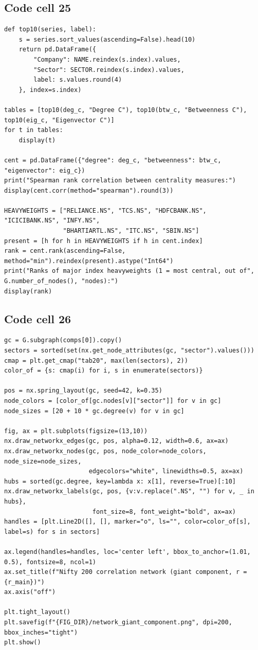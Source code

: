 \documentclass[12pt,a4paper]{report}
\begin{document}
\subsection*{Code cell 25}
\begin{lstlisting}[style=fancy]
def top10(series, label):
    s = series.sort_values(ascending=False).head(10)
    return pd.DataFrame({
        "Company": NAME.reindex(s.index).values,
        "Sector": SECTOR.reindex(s.index).values,
        label: s.values.round(4)
    }, index=s.index)

tables = [top10(deg_c, "Degree C"), top10(btw_c, "Betweenness C"), top10(eig_c, "Eigenvector C")]
for t in tables:
    display(t)

cent = pd.DataFrame({"degree": deg_c, "betweenness": btw_c, "eigenvector": eig_c})
print("Spearman rank correlation between centrality measures:")
display(cent.corr(method="spearman").round(3))

HEAVYWEIGHTS = ["RELIANCE.NS", "TCS.NS", "HDFCBANK.NS", "ICICIBANK.NS", "INFY.NS",
                "BHARTIARTL.NS", "ITC.NS", "SBIN.NS"]
present = [h for h in HEAVYWEIGHTS if h in cent.index]
rank = cent.rank(ascending=False, method="min").reindex(present).astype("Int64")
print("Ranks of major index heavyweights (1 = most central, out of", G.number_of_nodes(), "nodes):")
display(rank)
\end{lstlisting}

\subsection*{Code cell 26}
\begin{lstlisting}[style=fancy]
gc = G.subgraph(comps[0]).copy()
sectors = sorted(set(nx.get_node_attributes(gc, "sector").values()))
cmap = plt.get_cmap("tab20", max(len(sectors), 2))
color_of = {s: cmap(i) for i, s in enumerate(sectors)}

pos = nx.spring_layout(gc, seed=42, k=0.35)
node_colors = [color_of[gc.nodes[v]["sector"]] for v in gc]
node_sizes = [20 + 10 * gc.degree(v) for v in gc]

fig, ax = plt.subplots(figsize=(13,10))
nx.draw_networkx_edges(gc, pos, alpha=0.12, width=0.6, ax=ax)
nx.draw_networkx_nodes(gc, pos, node_color=node_colors, node_size=node_sizes,
                       edgecolors="white", linewidths=0.5, ax=ax)
hubs = sorted(gc.degree, key=lambda x: x[1], reverse=True)[:10]
nx.draw_networkx_labels(gc, pos, {v:v.replace(".NS", "") for v, _ in hubs},
                        font_size=8, font_weight="bold", ax=ax)
handles = [plt.Line2D([], [], marker="o", ls="", color=color_of[s], label=s) for s in sectors]

ax.legend(handles=handles, loc='center left', bbox_to_anchor=(1.01, 0.5), fontsize=8, ncol=1)
ax.set_title(f"Nifty 200 correlation network (giant component, r = {r_main})")
ax.axis("off")

plt.tight_layout()
plt.savefig(f"{FIG_DIR}/network_giant_component.png", dpi=200, bbox_inches="tight")
plt.show()
\end{lstlisting}
\end{document}
